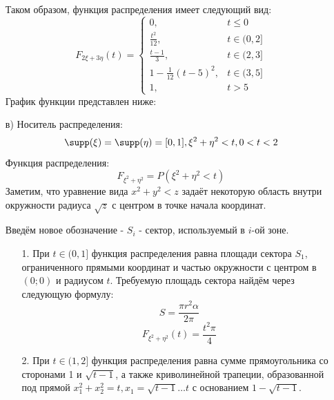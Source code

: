 \begin{enumerate}
\begin{figure}[H]
	\end{figure}
	Таком образом, функция распределения имеет следующий вид:
	\[
	F_{2\xi + 3\eta} (t) =
	\begin{cases}
		0, &t \le 0 \\
		\frac{t^2}{12}, &t \in (0, 2] \\
		\frac{t-1}{3}, &t \in (2, 3] \\
		1 - \frac{1}{12}(t-5)^2, &t \in (3, 5] \\
		1, &t > 5
	\end{cases}
	\]
	График функции представлен ниже:
	\begin{figure}[H]
	\end{figure}

	\item[в)]
	Носитель распределения:
	\[ \supp (\xi) = \supp (\eta) = [0, 1], \xi^2 + \eta^2 < t, 0 < t < 2 \]
	Функция распределения:
	\[ F_{\xi^2 + \eta^2} = P(\xi^2 + \eta^2 < t) \]
	Заметим, что уравнение вида $x^2 + y^2 < z$ задаёт некоторую область внутри окружности радиуса $\sqrt{z}$ с центром в точке начала координат.
	
	Введём новое обозначение - $S_i$ - сектор, используемый в $i$-ой зоне.
	
	\begin{enumerate}
		\item[1.] При $t \in (0, 1]$ функция распределения равна площади сектора $S_1$, ограниченного прямыми координат и частью окружности с центром в $(0;0)$ и радиусом $t$. Требуемую площадь сектора найдём через следующую формулу:
		\[ S = \frac{\pi r^2 \alpha}{2 \pi} \]
		\[ F_{\xi^2 + \eta^2} (t) = \frac{t^2 \pi}{4} \]
		 \item[2.] При $t \in (1, 2]$ функция распределения равна сумме прямоугольника со сторонами 1 и $\sqrt{t-1}$, а также криволинейной трапеции, образованной под прямой $x_1^2 + x_2^2 = t, x_1 = \sqrt{t-1} \dots t$ с основанием $1 - \sqrt{t-1}$.
		 

\end{enumerate}
\end{enumerate}
